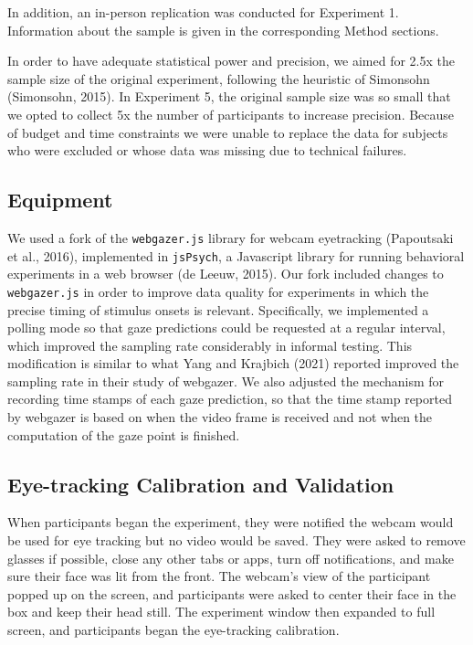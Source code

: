 \documentclass[
  man,floatsintext]{apa6}
\begin{document}
In addition, an in-person replication was conducted for Experiment 1.
Information about the sample is given in the corresponding Method sections.

In order to have adequate statistical power and precision, we aimed for
2.5x the sample size of the original experiment, following the heuristic
of Simonsohn (Simonsohn, 2015). In Experiment 5, the original sample size was so
small that we opted to collect 5x the number of participants to increase
precision. Because of budget and time constraints we were unable to
replace the data for subjects who were excluded or whose data was
missing due to technical failures.

\hypertarget{equipment}{%
\subsection{Equipment}\label{equipment}}

We used a fork of the \texttt{webgazer.js} library for webcam eyetracking
(Papoutsaki et al., 2016), implemented in \texttt{jsPsych}, a Javascript
library for running behavioral experiments in a web browser
(de Leeuw, 2015). Our fork included changes to
\texttt{webgazer.js} in order to improve data quality for experiments in which
the precise timing of stimulus onsets is relevant. Specifically, we
implemented a polling mode so that gaze predictions could be requested
at a regular interval, which improved the sampling rate considerably in
informal testing. This modification is similar to what Yang and Krajbich
(2021) reported improved the sampling rate in their study of
webgazer. We also adjusted the mechanism for recording time stamps of
each gaze prediction, so that the time stamp reported by webgazer is
based on when the video frame is received and not when the computation
of the gaze point is finished.

\hypertarget{eye-tracking-calibration-and-validation}{%
\subsection{Eye-tracking Calibration and Validation}\label{eye-tracking-calibration-and-validation}}

When participants began the experiment, they were notified the webcam
would be used for eye tracking but no video would be saved. They were
asked to remove glasses if possible, close any other tabs or apps, turn
off notifications, and make sure their face was lit from the front. The
webcam's view of the participant popped up on the screen, and
participants were asked to center their face in the box and keep their
head still. The experiment window then expanded to full screen, and
participants began the eye-tracking calibration.
\end{document}
